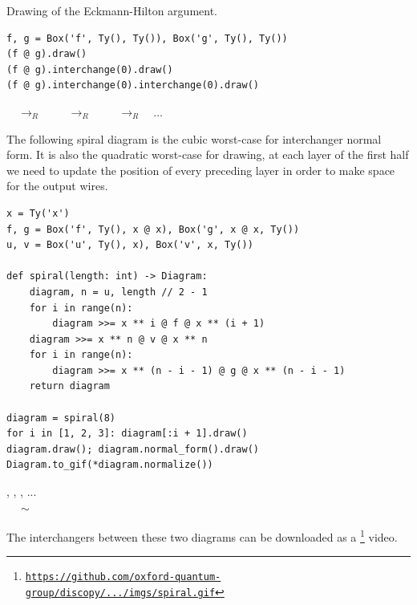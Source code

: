 \begin{example}
{\normalfont Drawing of the Eckmann-Hilton argument.}

\begin{verbatim}
f, g = Box('f', Ty(), Ty()), Box('g', Ty(), Ty())
(f @ g).draw()
(f @ g).interchange(0).draw()
(f @ g).interchange(0).interchange(0).draw()
\end{verbatim}

\begin{center}
$\quad \to_R \quad$ 
$\quad \to_R \quad$ 
$\quad \to_R \quad \dots$
\end{center}
\end{example}

\begin{example}\label{example:spiral}
The following spiral diagram is the cubic worst-case for interchanger normal form.
It is also the quadratic worst-case for drawing, at each layer of the first half we need to update the position of every preceding layer in order to make space for the output wires.

\begin{verbatim}
x = Ty('x')
f, g = Box('f', Ty(), x @ x), Box('g', x @ x, Ty())
u, v = Box('u', Ty(), x), Box('v', x, Ty())

def spiral(length: int) -> Diagram:
    diagram, n = u, length // 2 - 1
    for i in range(n):
        diagram >>= x ** i @ f @ x ** (i + 1)
    diagram >>= x ** n @ v @ x ** n
    for i in range(n):
        diagram >>= x ** (n - i - 1) @ g @ x ** (n - i - 1)
    return diagram

diagram = spiral(8)
for i in [1, 2, 3]: diagram[:i + 1].draw()
diagram.draw(); diagram.normal_form().draw()
Diagram.to_gif(*diagram.normalize())
\end{verbatim}
\begin{center}
,
,
, ... \\
\vspace{5pt}
 $\quad \sim \quad$
\end{center}
The interchangers between these two diagrams can be downloaded as a \footnote
{\href{https://github.com/oxford-quantum-group/discopy/blob/f364ce218890d87fda4aa5c1f4f770f07c7b4f25/docs/_static/imgs/spiral.gif}{\nolinkurl{https://github.com/oxford-quantum-group/discopy/.../imgs/spiral.gif}}} video.
\end{example}

